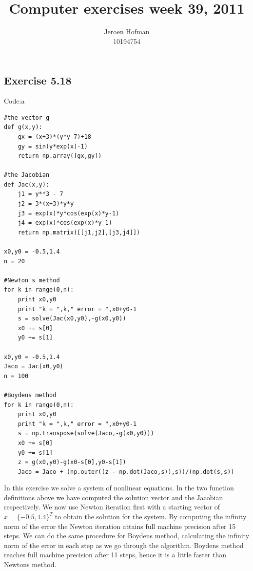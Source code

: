 \documentclass[10pt,a4paper]{article}
\begin{document}

\author{Jeroen Hofman\\
		10194754\\
		}
\title{Computer exercises week 39, 2011\\
		}
\date{}
\maketitle

\subsection*{Exercise 5.18}
Code:a
\begin{lstlisting}
#the vector g
def g(x,y):
    gx = (x+3)*(y*y-7)+18
    gy = sin(y*exp(x)-1)
    return np.array([gx,gy])

#the Jacobian
def Jac(x,y):
    j1 = y**3 - 7
    j2 = 3*(x+3)*y*y
    j3 = exp(x)*y*cos(exp(x)*y-1)
    j4 = exp(x)*cos(exp(x)*y-1)
    return np.matrix([[j1,j2],[j3,j4]])

x0,y0 = -0.5,1.4
n = 20

#Newton's method
for k in range(0,n):
    print x0,y0
    print "k = ",k," error = ",x0+y0-1
    s = solve(Jac(x0,y0),-g(x0,y0))
    x0 += s[0]
    y0 += s[1]

x0,y0 = -0.5,1.4
Jaco = Jac(x0,y0) 
n = 100

#Boydens method
for k in range(0,n):
    print x0,y0
    print "k = ",k," error = ",x0+y0-1
    s = np.transpose(solve(Jaco,-g(x0,y0)))
    x0 += s[0]
    y0 += s[1]
    z = g(x0,y0)-g(x0-s[0],y0-s[1])
    Jaco = Jaco + (np.outer((z - np.dot(Jaco,s)),s))/(np.dot(s,s))
\end{lstlisting}

\noindent In this exercise we solve a system of nonlinear equations. In the two function definitions above we have computed the solution vector and the Jacobian respectively. We now use Newton iteration first with a starting vector of $x = \{-0.5,1.4\}^{T}$ to obtain the solution for the system. By computing the infinity norm of the error the Newton iteration attains full machine precision after 15 steps. We can do the same procedure for Boydens method, calculating the infinity norm of the error in each step as we go through the algorithm. Boydens method reaches full machine precision after 11 steps, hence it is a little faster than Newtons method.
\end{document}
